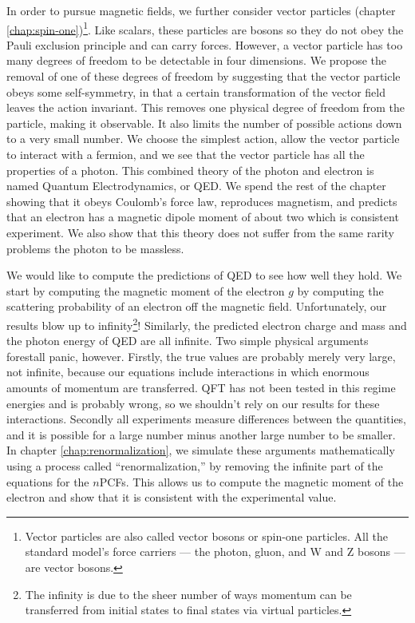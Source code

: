In order to pursue magnetic fields, we further consider vector particles (chapter \ref{chap:spin-one})\footnote{Vector particles are also called vector bosons or spin-one particles. All the standard model's force carriers --- the photon, gluon, and W and Z bosons --- are vector bosons.}. Like scalars, these particles are bosons so they do not obey the Pauli exclusion principle and can carry forces. However, a vector particle has too many degrees of freedom to be detectable in four dimensions. We propose the removal of one of these degrees of freedom by suggesting that the vector particle obeys some self-symmetry, in that a certain transformation of the vector field leaves the action invariant. This removes one physical degree of freedom from the particle, making it observable. It also limits the number of possible actions down to a very small number. We choose the simplest action, allow the vector particle to interact with a fermion, and we see that the vector particle has all the properties of a photon. This combined theory of the photon and electron is named Quantum Electrodynamics, or QED. We spend the rest of the chapter showing that it obeys Coulomb's force law, reproduces magnetism, and predicts that an electron has a magnetic dipole moment of about two which is consistent experiment. We also show that this theory does not suffer from the same rarity problems the photon to be massless.

We would like to compute the predictions of QED to see how well they hold. We start by computing the magnetic moment of the electron $g$ by computing the scattering probability of an electron off the magnetic field. Unfortunately, our results blow up to infinity\footnote{The infinity is due to the sheer number of ways momentum can be transferred from initial states to final states via virtual particles.}! Similarly, the predicted electron charge and mass and the photon energy of QED are all infinite. Two simple physical arguments forestall panic, however. Firstly, the true values are probably merely very large, not infinite, because our equations include interactions in which enormous amounts of momentum are transferred. QFT has not been tested in this regime energies and is probably wrong, so we shouldn't rely on our results for these interactions. Secondly all experiments measure differences between the quantities, and it is possible for a large number minus another large number to be smaller. In chapter \ref{chap:renormalization}, we simulate these arguments mathematically using a process called ``renormalization,'' by removing the infinite part of the equations for the $n$PCFs. This allows us to compute the magnetic moment of the electron and show that it is consistent with the experimental value.

